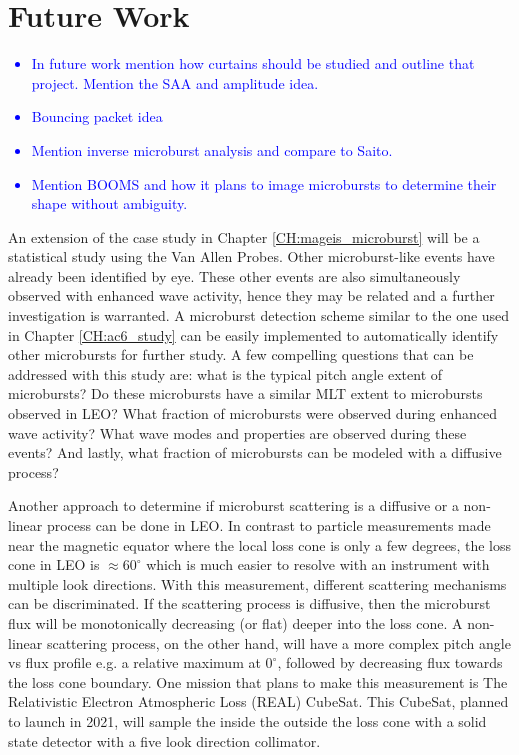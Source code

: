 \section{Future Work}
\textcolor{blue}{
\begin{itemize}
\item In future work mention how curtains should be studied and outline that project. Mention the SAA and amplitude idea.
\item Bouncing packet idea
\item Mention inverse microburst analysis and compare to Saito.
\item Mention BOOMS and how it plans to image microbursts to determine their shape without ambiguity. 
\end{itemize}
}

An extension of the case study in Chapter \ref{CH:mageis_microburst} will be a statistical study using the Van Allen Probes. Other microburst-like events have already been identified by eye. These other events are also simultaneously observed with enhanced wave activity, hence they may be related and a further investigation is warranted. A microburst detection scheme similar to the one used in Chapter \ref{CH:ac6_study} can be easily implemented to automatically identify other microbursts for further study. A few compelling questions that can be addressed with this study are: what is the typical pitch angle extent of microbursts? Do these microbursts have a similar MLT extent to microbursts observed in LEO? What fraction of microbursts were observed during enhanced wave activity? What wave modes and properties are observed during these events? And lastly, what fraction of microbursts can be modeled with a diffusive process?

Another approach to determine if microburst scattering is a diffusive or a non-linear process can be done in LEO. In contrast to particle measurements made near the magnetic equator where the local loss cone is only a few degrees, the loss cone in LEO is $\approx 60^\circ$ which is much easier to resolve with an instrument with multiple look directions. With this measurement, different scattering mechanisms can be discriminated. If the scattering process is diffusive, then the microburst flux will be monotonically decreasing (or flat) deeper into the loss cone. A non-linear scattering process, on the other hand, will have a more complex pitch angle vs flux profile e.g. a relative maximum at $0^\circ$, followed by decreasing flux towards the loss cone boundary. One mission that plans to make this measurement is The Relativistic Electron Atmospheric Loss (REAL) CubeSat. This CubeSat, planned to launch in 2021, will sample the inside the outside the loss cone with a solid state detector with a five look direction collimator.

